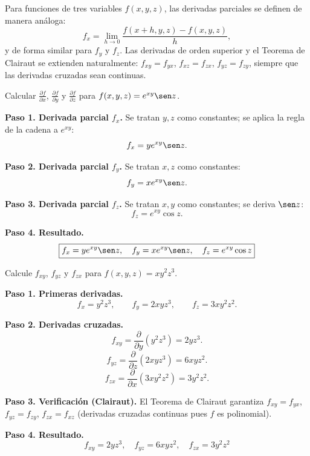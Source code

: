 
Para funciones de tres variables $f(x,y,z)$, las derivadas parciales
se definen de manera análoga:
\[
f_x = \lim_{h\to 0}\frac{f(x+h,y,z)-f(x,y,z)}{h},
\]
y de forma similar para $f_y$ y $f_z$. Las derivadas de orden
superior y el Teorema de Clairaut se extienden naturalmente:
$f_{xy}=f_{yx}$, $f_{xz}=f_{zx}$, $f_{yz}=f_{zy}$, siempre que las
derivadas cruzadas sean continuas.

\begin{example}
Calcular $\frac{\partial f}{\partial x}$, $\frac{\partial f}{\partial y}$
y $\frac{\partial f}{\partial z}$ para $f(x,y,z)=e^{xy}\sen z$.
\begin{myproof}
\textbf{Paso 1. Derivada parcial $f_x$.}
Se tratan $y, z$ como constantes; se aplica la regla de la cadena a $e^{xy}$:
\[
f_x = y e^{xy}\sen z.
\]

\textbf{Paso 2. Derivada parcial $f_y$.}
Se tratan $x, z$ como constantes:
\[
f_y = x e^{xy}\sen z.
\]

\textbf{Paso 3. Derivada parcial $f_z$.}
Se tratan $x, y$ como constantes; se deriva $\sen z$:
\[
f_z = e^{xy}\cos z.
\]

\textbf{Paso 4. Resultado.}
\[
\boxed{f_x=ye^{xy}\sen z,\quad f_y=xe^{xy}\sen z,\quad f_z=e^{xy}\cos z}
\]
\end{myproof}
\end{example}

\begin{prob}
Calcule $f_{xy}$, $f_{yz}$ y $f_{zx}$ para $f(x,y,z)=x y^2 z^3$.
\begin{myproof}
\textbf{Paso 1. Primeras derivadas.}
\[
f_x = y^2 z^3,\qquad f_y = 2xyz^3,\qquad f_z = 3xy^2 z^2.
\]

\textbf{Paso 2. Derivadas cruzadas.}
\[
f_{xy} = \frac{\partial}{\partial y}(y^2 z^3) = 2yz^3.
\]
\[
f_{yz} = \frac{\partial}{\partial z}(2xyz^3) = 6xyz^2.
\]
\[
f_{zx} = \frac{\partial}{\partial x}(3xy^2 z^2) = 3y^2 z^2.
\]

\textbf{Paso 3. Verificación (Clairaut).}
El Teorema de Clairaut garantiza $f_{xy}=f_{yx}$, $f_{yz}=f_{zy}$, $f_{zx}=f_{xz}$ (derivadas cruzadas continuas pues $f$ es polinomial).

\textbf{Paso 4. Resultado.}
\[
\boxed{f_{xy}=2yz^3,\quad f_{yz}=6xyz^2,\quad f_{zx}=3y^2z^2}
\]
\end{myproof}
\end{prob}

